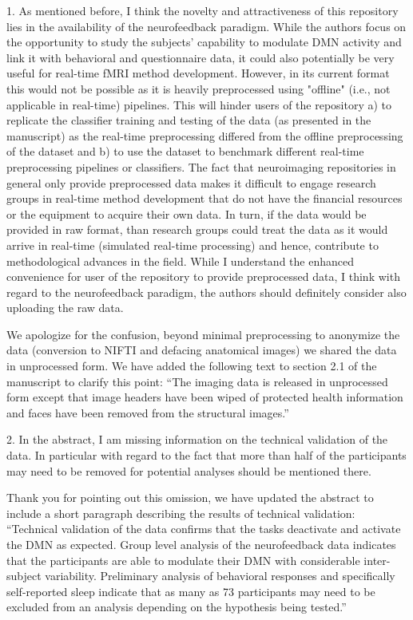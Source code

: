 \documentclass{article}
\newcommand{\RESPONSE}[1]{\textcolor{responseblue}{#1}}
\begin{document}
1. As mentioned before, I think the novelty and attractiveness of this repository lies in the availability of the neurofeedback paradigm. While the authors focus on the opportunity to study the subjects' capability to modulate DMN activity and link it with behavioral and questionnaire data, it could also potentially be very useful for real-time fMRI method development. However, in its current format this would not be possible as it is heavily preprocessed using "offline" (i.e., not applicable in real-time) pipelines. This will hinder users of the repository a) to replicate the classifier training and testing of the data (as presented in the manuscript) as the real-time preprocessing differed from the offline preprocessing of the dataset and b) to use the dataset to benchmark different real-time preprocessing pipelines or classifiers. The fact that neuroimaging repositories in general only provide preprocessed data makes it difficult to engage research groups in real-time method development that do not have the financial resources or the equipment to acquire their own data. In turn, if the data would be provided in raw format, than research groups could treat the data as it would arrive in real-time (simulated real-time processing) and hence, contribute to methodological advances in the field. While I understand the enhanced convenience for user of the repository to provide preprocessed data, I think with regard to the neurofeedback paradigm, the authors should definitely consider also uploading the raw data.

\RESPONSE{We apologize for the confusion, beyond minimal preprocessing to anonymize the data (conversion to NIFTI and defacing anatomical images) we shared the data in unprocessed form. We have added the following text to section 2.1 of the manuscript to clarify this point: ``The imaging data is released in unprocessed form except that image headers have been wiped of protected health information and faces have been removed from the structural images.''}

2. In the abstract, I am missing information on the technical validation of the data. In particular with regard to the fact that more than half of the participants may need to be removed for potential analyses should be mentioned there.

\RESPONSE{Thank you for pointing out this omission, we have updated the abstract to include a short paragraph describing the results of technical validation: ``Technical validation of the data confirms that the tasks deactivate and activate the DMN as expected. Group level analysis of the neurofeedback data indicates that the participants are able to modulate their DMN with considerable inter-subject variability. Preliminary analysis of behavioral responses and specifically self-reported sleep indicate that as many as 73 participants may need to be excluded from an analysis depending on the hypothesis being tested.''}
\end{document}
